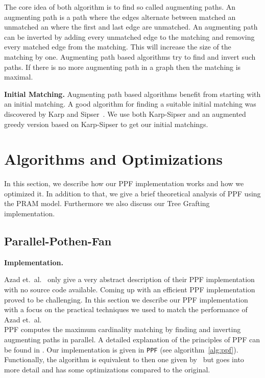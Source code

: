 \documentclass[letterpaper]{article}
\newcommand{\mypar}[1]{{\bf #1.}}
\begin{document}
The core idea of both algorithm is to find so called augmenting paths. An augmenting path is a path where the edges alternate between matched an unmatched an where the first 
and last edge are unmatched. An augmenting path can be inverted by adding every unmatched edge to the matching and removing every matched edge from the matching. 
This will increase the size of the matching by one. 
Augmenting path based algorithms try to find and invert such paths. If there is no more augmenting path in a graph then the matching is maximal.

\mypar{Initial Matching}
Augmenting path based algorithms benefit from starting with an initial matching. 
A good algorithm for finding a suitable initial matching was discovered by Karp and Sipser~\cite{KarpS81}.
We use both Karp-Sipser and an augmented greedy version based on Karp-Sipser to get our initial matchings. 

\section{Algorithms and Optimizations}\label{sec:pfopt}

In this section, we describe how our PPF implementation works and how we optimized it. In addition to that, we 
give a brief theoretical analysis of PPF using the PRAM model. Furthermore we also discuss our Tree Grafting implementation.

\subsection{Parallel-Pothen-Fan}\label{sec:pf}

\mypar{Implementation}

Azad et.\ al.~\cite{Azad:2012} only give a very abstract description of their PPF implementation with no source code available. 
Coming up with an efficient PPF implementation proved to be challenging. 
In this section we describe our PPF implementation with a focus on the practical techniques we used to match the performance of Azad et.\ al.\\

PPF computes the maximum cardinality matching by finding and inverting augmenting paths in parallel. 
A detailed explanation of the principles of PPF can be found in \cite{Azad:2012}. 
Our implementation is given in \texttt{PPF} (see algorithm~\ref{alg:ppf}). Functionally, the algorithm is equivalent to then one given by~\cite{Azad:2012} 
but goes into more detail and has some optimizations compared to the original.\\
\end{document}
